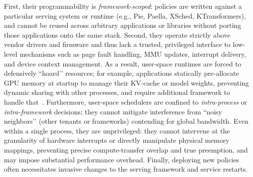  First, their programmability is \emph{framework-scoped}:
policies are written against a particular serving system or runtime (e.g.,
Pie, Paella, XSched, KTransformers), and cannot be reused across arbitrary
applications or libraries without porting those applications onto the same
stack. Second, they operate strictly above vendor drivers and firmware and thus
lack a trusted, privileged interface to low-level mechanisms such as page
fault handling, MMU updates, interrupt delivery, and device context
management. As a result, user-space runtimes are forced to defensively
“hoard’’ resources; for example, applications statically pre-allocate GPU
memory at startup to manage their KV-cache or model weights, 
preventing dynamic sharing with other processes, and require additional framework to handle that~\cite{lmcache}. 
Furthermore, user-space schedulers are confined to
\emph{intra-process} or \emph{intra-framework} decisions; they cannot mitigate
interference from ``noisy neighbors’’ (other tenants or frameworks) contending
for global bandwidth. 
Even within a single process, they are unprivileged:
they cannot intervene at the granularity of hardware interrupts or directly
manipulate physical memory mappings, preventing precise compute-transfer
overlap and true preemption, and may impose substantial performance overhead.
Finally, deploying new policies often necessitates invasive changes to the
serving framework and service restarts. 




